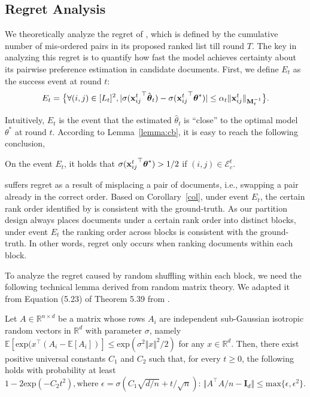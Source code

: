 \subsection{Regret Analysis}

We theoretically analyze the regret of \model{}, which is defined by the cumulative number of mis-ordered pairs in its proposed ranked list till round $T$. 
The key in analyzing this regret is to quantify how fast the model achieves certainty about its pairwise preference estimation in candidate documents. First, we define $E_t$ as the success event at round $t$:
\begin{equation*}
    E_t = \big\{ \forall (i, j) \in [L_t]^2, |\sigma({\mathbf{x}_{ij}^t}^\top\hat{\boldsymbol{\theta}}_t) - \sigma({\mathbf{x}_{ij}^t}^\top\boldsymbol{\theta}^*) | \leq \alpha_t\Vert\mathbf{x}_{ij}^t\Vert_{\mathbf{M}_t^{-1}}\big\}.
\end{equation*}

Intuitively, $E_t$ is the event that the estimated $\hat{\theta}_t$ is ``close'' to the optimal model $\theta^*$ at round $t$. According to Lemma~\ref{lemma:cb}, it is easy to reach the following conclusion,

\begin{corollary}On the event $E_t$, it holds that $\sigma({\mathbf{x}_{ij}^t}^\top\boldsymbol{\theta}^*) > {1}/{2}$ if $(i, j) \in \mathcal{E}_c^t$.
\label{col}
\end{corollary} 

\model{} suffers regret as a result of misplacing a pair of documents, i.e., swapping a pair already in the correct order. Based on Corollary~\ref{col}, under event $E_t$, the certain rank order identified by \model{} is consistent with the ground-truth. 
As our partition design always places documents under a certain rank order into distinct blocks, under event $E_t$ the ranking order across blocks is consistent with the ground-truth. In other words, regret only occurs when ranking documents within each block.


To analyze the regret caused by random shuffling within each block, we need the following technical lemma derived from random matrix theory. We adapted it from Equation (5.23) of Theorem 5.39 from \cite{vershynin2010introduction}.

\begin{lemma}
\label{lemma:matrix}
Let $A \in \mathbb{R}^{n \times d}$ be a matrix whose rows $A_i$ are independent sub-Gaussian isotropic random vectors in $\mathbb{R}^d$ with parameter $\sigma$, namely $\mathbb{E}[\text{exp}(x^\top (A_i - \mathbb{E}[A_i])] \leq \text{exp}(\sigma^2\Vert x \Vert ^2 / 2)$ for any $x \in \mathbb{R}^d$. Then, there exist positive universal constants $C_1$ and $C_2$ such that, for every $t \geq 0$, the following holds with probability at least $1 - 2\text{exp}(-C_2t^2), \text{where } \epsilon = \sigma(C_1\sqrt{d/n} + {t}/{\sqrt{n}})$: $\Vert A^\top A/n - \mathbf{I}_d\Vert \leq \text{max}\{\epsilon, \epsilon^2\}$.
\end{lemma}

